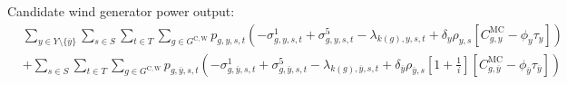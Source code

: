 \documentclass{article}
\newcommand{\sGeneratorsCandidateWind}{G^{\mathrm{C,W}}}
\newcommand{\sYears}{Y}
\newcommand{\sScenarios}{S}
\newcommand{\sIntervals}{T}
\newcommand{\iGenerator}{g}
\newcommand{\iYear}{y}
\newcommand{\iYearTerminal}{\overline{\iYear}}
\newcommand{\iScenario}{s}
\newcommand{\iInterval}{t}
\newcommand{\iIntervalTerminal}{\overline{\iInterval}}
\newcommand{\iZone}{z}
\newcommand{\cScenarioDuration}[1][\iYear,\iScenario]{\rho_{#1}}
\newcommand{\cMarginalCost}[1][\iGenerator,\iYear]{C^{\mathrm{MC}}_{#1}}
\newcommand{\cInterestRate}{i}
\newcommand{\cDiscountRate}[1][\iYear]{\delta_{#1}}
\newcommand{\vBaseline}[1][\iYear]{\phi_{#1}}
\newcommand{\vPermitPrice}[1][\iYear]{\tau_{#1}}
\newcommand{\vPower}[1][\iGenerator,\iYear,\iScenario,\iInterval]{p_{#1}}
\newcommand{\dMinPowerOutput}[1][\iGenerator,\iYear,\iScenario,\iInterval]{\sigma_{#1}^{1}}
\newcommand{\dMaxPowerOutputWindCandidate}[1][\iGenerator,\iYear,\iScenario,\iInterval]{\sigma_{#1}^{5}}
\newcommand{\dRampRateUp}[1][\iGenerator,\iYear,\iScenario,\iInterval]{\sigma_{#1}^{20}}
\newcommand{\dRampRateDown}[1][\iGenerator,\iYear,\iScenario,\iInterval]{\sigma_{#1}^{23}}
\newcommand{\dPowerBalance}[1][\iZone,\iYear,\iScenario,\iInterval]{\lambda_{#1}}
\newcommand{\dGeneratorEnergyOutput}[1][\iGenerator,\iYear,\iScenario,\iInterval]{\zeta_{#1}^{2}}
\begin{document}
Candidate wind generator power output:
\begin{align}
	& \sum\limits_{\iYear \in \sYears 
		\setminus \{\iYearTerminal\}
	}\sum\limits_{\iScenario \in \sScenarios}\sum\limits_{\iInterval \in \sIntervals} \sum\limits_{\iGenerator \in \sGeneratorsCandidateWind} \vPower\left(-\dMinPowerOutput + \dMaxPowerOutputWindCandidate 
	- \dPowerBalance[k(\iGenerator),\iYear,\iScenario,\iInterval] + \cDiscountRate \cScenarioDuration \left[\cMarginalCost - \vBaseline\vPermitPrice \right]
	\right) \nonumber\\
	& + \sum\limits_{\iScenario \in \sScenarios} \sum\limits_{\iInterval \in \sIntervals} \sum\limits_{\iGenerator \in \sGeneratorsCandidateWind} \vPower[\iGenerator,\iYearTerminal,\iScenario,\iInterval] \left(-\dMinPowerOutput[\iGenerator,\iYearTerminal,\iScenario,\iInterval] + \dMaxPowerOutputWindCandidate[\iGenerator,\iYearTerminal,\iScenario,\iInterval] - \dPowerBalance[k(\iGenerator),\iYearTerminal,\iScenario,\iInterval] + \cDiscountRate[\iYearTerminal] \cScenarioDuration[\iYearTerminal,\iScenario] \left[1 + \frac{1}{\cInterestRate}\right] \left[\cMarginalCost[\iGenerator,\iYearTerminal] - \vBaseline[\iYearTerminal]\vPermitPrice[\iYearTerminal] \right] \right)\nonumber\\
\end{align}
\end{document}

